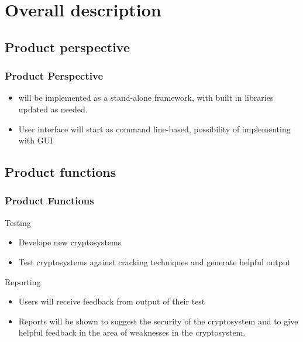 
\section{Overall description}


\subsection{Product perspective}

\begin{frame} %
\frametitle{Product Perspective}
\begin{itemize}
  \item \cry{} will be implemented as a stand-alone framework, with built in libraries updated as needed. 
  \item User interface will start as command line-based, possibility of implementing with GUI
\end{itemize}
\end{frame}


\subsection{Product functions}
\begin{frame}
\frametitle{Product Functions}
Testing
\begin{itemize}
  \item Develope new cryptosystems
  \item Test cryptosystems against cracking techniques and generate helpful output
\end{itemize}
Reporting
\begin{itemize}
  \item Users will receive feedback from output of their test
  \item Reports will be shown to suggest the security of the cryptosystem and to give helpful feedback
    in the area of weaknesses in the cryptosystem.
\end{itemize}
\end{frame}

